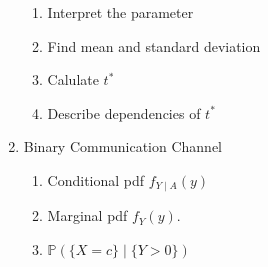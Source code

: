 \documentclass{article}
\begin{document}
\begin{enumerate}
\begin{enumerate}
  \item Interpret the parameter

  \item Find mean and standard deviation

  \item Calulate $t^*$

  \item Describe dependencies of $t^*$

  \end{enumerate}

\item Binary Communication Channel
  \begin{enumerate}
  \item Conditional pdf $f_{Y\mid A}(y)$
  \item Marginal pdf $f_Y(y)$.

  \item $\mathbb{P}(\{X = c \} \mid \{Y > 0\})$

  \end{enumerate}
\end{enumerate}
\end{document}
